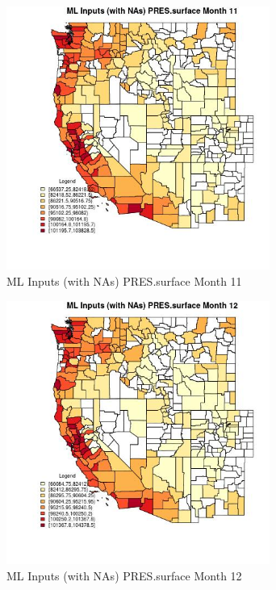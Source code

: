 \begin{figure} 
\centering  
\includegraphics[width=0.77\textwidth]{Code_Outputs/Report_ML_input_PM25_Step4_part_e_de_duplicated_aves_compiled_2019-05-21wNAs_CountyPRESsurfacemedianMonth11.jpg} 
\caption{\label{fig:Report_ML_input_PM25_Step4_part_e_de_duplicated_aves_compiled_2019-05-21wNAsCountyPRESsurfacemedianMonth11}ML Inputs (with NAs) PRES.surface Month 11} 
\end{figure} 
 

\begin{figure} 
\centering  
\includegraphics[width=0.77\textwidth]{Code_Outputs/Report_ML_input_PM25_Step4_part_e_de_duplicated_aves_compiled_2019-05-21wNAs_CountyPRESsurfacemedianMonth12.jpg} 
\caption{\label{fig:Report_ML_input_PM25_Step4_part_e_de_duplicated_aves_compiled_2019-05-21wNAsCountyPRESsurfacemedianMonth12}ML Inputs (with NAs) PRES.surface Month 12} 
\end{figure} 
 

